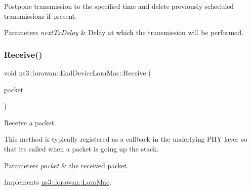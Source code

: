 Postpone transmission to the specified time and delete previously scheduled transmissions if present.


\begin{DoxyParams}{Parameters}
{\em next\+Tx\+Delay} & Delay at which the transmission will be performed. \\
\hline
\end{DoxyParams}
\mbox{\label{classns3_1_1lorawan_1_1EndDeviceLoraMac_a7bb29a550534c631e2ee7cc3407a2bcd}} 
\subsubsection{\texorpdfstring{Receive()}{Receive()}}
{\footnotesize\ttfamily void ns3\+::lorawan\+::\+End\+Device\+Lora\+Mac\+::\+Receive (\begin{DoxyParamCaption}\item[{Ptr$<$ Packet const $>$}]{packet }\end{DoxyParamCaption})\hspace{0.3cm}{\ttfamily [virtual]}}

Receive a packet.

This method is typically registered as a callback in the underlying P\+HY layer so that it\textquotesingle{}s called when a packet is going up the stack.


\begin{DoxyParams}{Parameters}
{\em packet} & the received packet. \\
\hline
\end{DoxyParams}


Implements \hyperlink{classns3_1_1lorawan_1_1LoraMac_a6eda46656789a277b8e103afcefdc21a}{ns3\+::lorawan\+::\+Lora\+Mac}.

\mbox{\label{classns3_1_1lorawan_1_1EndDeviceLoraMac_aaa243098bbaf100c7880d2ff9d936ac3}} 
